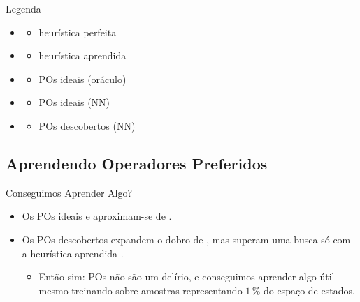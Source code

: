 \documentclass{beamer}
\begin{document}
\begin{frame}{Legenda}
\begin{multicols}{3}
\begin{itemize}
  \item \hstar
    \begin{itemize}
      \item heurística perfeita
    \end{itemize}
  \item \hnn
    \begin{itemize}
      \item heurística aprendida
    \end{itemize}
  \item \postartable
    \begin{itemize}
      \item POs ideais (oráculo)
    \end{itemize}
  \item \postar
    \begin{itemize}
      \item POs ideais (NN)
    \end{itemize}
  \item \alert{\pog}
    \begin{itemize}
      \item POs descobertos (NN)
    \end{itemize}

\end{itemize}
\end{multicols}
\end{frame}

\subsection{Aprendendo Operadores Preferidos}
\begin{frame}{Conseguimos Aprender Algo?}

\pause
\begin{itemize}
\item Os POs ideais \postartable e \postar aproximam-se de \hstar.
\pause
\item Os POs descobertos \pog expandem o dobro de \hstar, mas superam uma busca só com a heurística aprendida \hnn.
\pause
  \begin{itemize}
    \item Então sim: POs não são um delírio, e \alert{conseguimos aprender algo útil} mesmo treinando sobre amostras representando \alert{$1\,\%$ do espaço de estados}.
  \end{itemize}
\end{itemize}
\end{frame}
\end{document}
